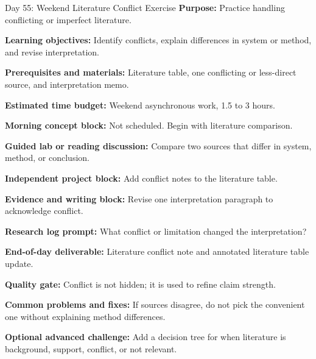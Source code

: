\begin{dailybox}{Day 55: Weekend Literature Conflict Exercise}
\textbf{Purpose:} Practice handling conflicting or imperfect literature.

\textbf{Learning objectives:} Identify conflicts, explain differences in system or method, and revise interpretation.

\textbf{Prerequisites and materials:} Literature table, one conflicting or less-direct source, and interpretation memo.

\textbf{Estimated time budget:} Weekend asynchronous work, 1.5 to 3 hours.

\textbf{Morning concept block:} Not scheduled. Begin with literature comparison.

\textbf{Guided lab or reading discussion:} Compare two sources that differ in system, method, or conclusion.

\textbf{Independent project block:} Add conflict notes to the literature table.

\textbf{Evidence and writing block:} Revise one interpretation paragraph to acknowledge conflict.

\textbf{Research log prompt:} What conflict or limitation changed the interpretation?

\textbf{End-of-day deliverable:} Literature conflict note and annotated literature table update.

\textbf{Quality gate:} Conflict is not hidden; it is used to refine claim strength.

\textbf{Common problems and fixes:} If sources disagree, do not pick the convenient one without explaining method differences.

\textbf{Optional advanced challenge:} Add a decision tree for when literature is background, support, conflict, or not relevant.
\end{dailybox}

